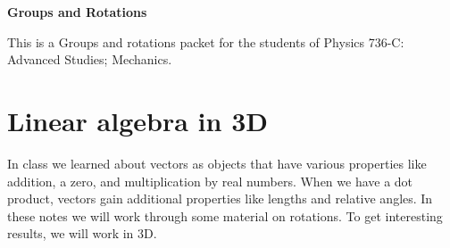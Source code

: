 %


\def\red#1{{\color{red}#1}}
\def\blue#1{{\color{blue}#1}}
\def\green#1{{\color{green}#1}}

\usepackage{placeins}
\usepackage{mathrsfs}

\def\gap{38mm}

\usepackage{amsthm} %
\theoremstyle{definition}
\newtheorem{definition}{Definition}
\theoremstyle{plain}
\newtheorem{proposition}{Proposition}
\newtheorem{lemma}{Lemma}
\newtheorem{theorem}{Theorem}
\newtheorem{corollary}{Corollary}
\newtheorem{conjecture}{Conjecture}
\newtheorem{example}{Example}
\newtheorem{result}{Result}
\newtheorem{claim}{Claim}
\newtheorem*{result*}{Result}
\newtheorem{exercise}{Exercise}
\newtheorem{problem}{Problem}




{\center
{\color{violet}\fontsize{28pt}{34pt}\bf\sffamily 
Groups and Rotations
\\[.5in]
}

}
{\abstract
This is a Groups and rotations packet for the students of Physics 736-C: Advanced Studies; Mechanics.
}






\section{Linear algebra in 3D}
In class we learned about vectors as objects that have various properties like addition, a zero, and multiplication by real numbers. 
When we have a dot product, vectors gain additional properties like lengths and relative angles. 
In these notes we will work through some material on rotations. 
To get interesting results, we will work in 3D. 

